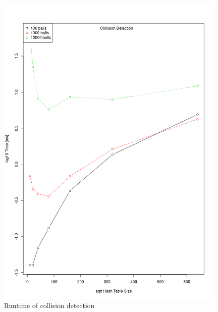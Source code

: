 \documentclass[a4paper]{scrartcl}
\begin{document}
\begin{figure}
	\centering
	\caption{Runtime of collision detection}
	\includegraphics[width=\linewidth]{resources/collision_detection.png}
\end{figure}

\FloatBarrier
\end{document}
